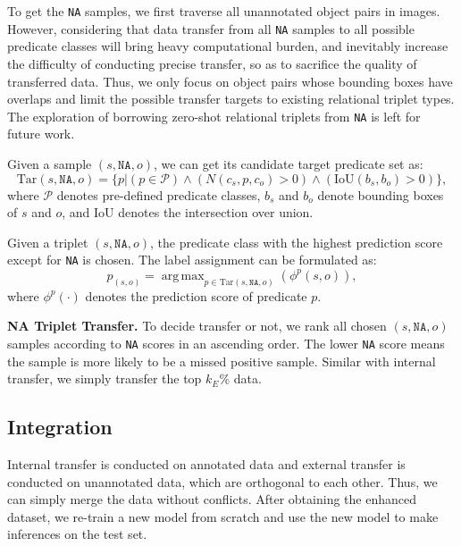 \documentclass[runningheads]{llncs}
\DeclareMathOperator*{\argmax}{arg\,max}
\begin{document}
To get the \texttt{NA} samples, we first traverse all unannotated object pairs in images. 
However, considering that data transfer from all \texttt{NA} samples to all possible predicate classes will bring heavy computational burden, and inevitably increase the difficulty of conducting precise transfer, so as to sacrifice the quality of  transferred data.
Thus, we only focus on object pairs whose bounding boxes have overlaps and limit the possible transfer targets to existing relational triplet types.
The exploration of borrowing zero-shot relational triplets from \texttt{NA} is left for future work.

Given a sample $(s, \texttt{NA}, o)$, we can get its candidate target predicate set as:
\begin{equation}
    \text{Tar}(s, \texttt{NA}, o) = \{p |(p \in \mathcal{P}) \wedge  ({N(c_s, p, c_o)} > 0) \wedge (\text{IoU}(b_{s}, b_{o})>0) \},
\end{equation}
where $\mathcal{P}$ denotes pre-defined predicate classes, $b_s$ and $b_o$ denote bounding boxes of $s$ and $o$, and $\text{IoU}$ denotes the intersection over union.

Given a triplet $(s, \texttt{NA}, o)$, the predicate class with the highest prediction score except for \texttt{NA} is chosen.
The label assignment can be formulated as:
\begin{equation}
    p_{(s, o)} = \argmax_{p\in \text{Tar}(s, \texttt{NA}, o)}(\phi^{p}(s, o)),
\end{equation}
where $\phi^{p}(\cdot)$ denotes the prediction score of predicate $p$.

\smallskip
\noindent
\textbf{NA Triplet Transfer.}
To decide transfer or not, we rank all chosen $(s, \texttt{NA}, o)$ samples according to \texttt{NA} scores in an ascending order.
The lower \texttt{NA} score means the sample is more likely to be a missed positive sample. 
Similar with internal transfer, we simply transfer the top $k_E$\% data.


\subsection{Integration}
Internal transfer is conducted on annotated data and external transfer is conducted on unannotated data, which are orthogonal to each other.
Thus, we can simply merge the data without conflicts.
After obtaining the enhanced dataset, we re-train a new model from scratch and use the new model to make inferences on the test set.
\end{document}
